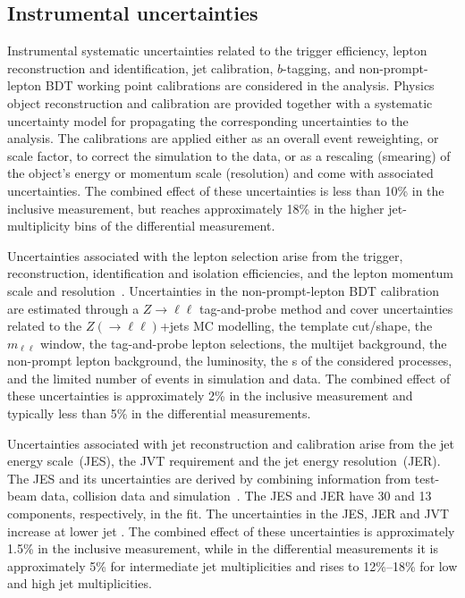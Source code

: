 \documentclass[cernpreprint, atlasdraft=false, texlive=2023, UKenglish, texmf, orcidlogo]{atlasdoc}
\begin{document}
\subsection{Instrumental uncertainties}
\label{sec:inst_syst}
Instrumental systematic uncertainties related to the trigger
efficiency, lepton reconstruction and identification, jet calibration,
$b$-tagging, and non-prompt-lepton BDT working point
calibrations are considered in the analysis.
Physics object reconstruction and calibration are provided together with a systematic uncertainty model for propagating the corresponding uncertainties to the analysis. The calibrations are applied either as an overall event reweighting, or scale factor, to correct the simulation to the data, or as a rescaling (smearing) of the object's energy or momentum scale (resolution) and come with associated uncertainties.
The combined effect of these uncertainties is less than 10\% in the inclusive measurement,
but reaches approximately 18\% in the higher jet-multiplicity bins of the differential measurement.
 
Uncertainties associated with the lepton selection arise from the
trigger, reconstruction, identification and isolation efficiencies,
and the lepton momentum scale and
resolution~\cite{PERF-2015-10,EGAM-2018-01,MUON-2018-03,MUON-2022-01}.
Uncertainties in the non-prompt-lepton BDT calibration are estimated through a
$Z\to\ell\ell$ tag-and-probe method and cover uncertainties related to the
$Z(\to\ell\ell)$+jets MC modelling, the template cut/shape,
the $m_{\ell\ell}$ window, the tag-and-probe lepton selections, the multijet background, the non-prompt
lepton background, the luminosity, the \xs{}s of the considered
processes, and the limited number of events in simulation and data. The combined effect of
these uncertainties is approximately 2\% in the inclusive measurement
and typically less than 5\% in the differential measurements.
 
Uncertainties associated with jet reconstruction and calibration
arise from the jet energy scale~(JES), the JVT requirement and the jet
energy resolution~(JER). The JES and its uncertainties are derived by
combining information from test-beam data, collision data and
simulation~\cite{JETM-2018-05}. The JES and JER have 30 and 13
components, respectively, in the fit. The uncertainties in the JES, JER
and JVT increase at lower jet \pt.  The combined effect of these
uncertainties is approximately 1.5\% in the inclusive measurement,
while in the differential measurements it is approximately 5\% for
intermediate jet multiplicities and rises to 12\%--18\% for low and high
jet multiplicities.
 
\end{document}
